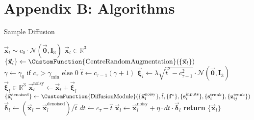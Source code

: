 \section*{Appendix B: Algorithms}
\begin{suppalgorithm}
     \caption{Sample Diffusion}
     {\small
     \begin{algorithmic}[1]
         \State $\vec{\mathbf{x}}_l \sim c_0 \cdot \mathcal{N}(\vec{\mathbf{0}}, \mathbf{I}_3)$ \hfill $\vec{\mathbf{x}}_l \in \mathbb{R}^3$
             \State $\{\vec{\mathbf{x}}_l\} \gets \CustomFunction{\text{CentreRandomAugmentation}}(\{\vec{\mathbf{x}}_l\})$
             \State $\gamma \gets \gamma_0 \text{ if } c_\tau > \gamma_{\min} \text{ else } 0$
             \State $\hat{t} \gets c_{\tau-1}(\gamma + 1)$
             \State $\vec{\boldsymbol{\xi}}_l \gets \lambda \sqrt{\hat{t}^2 - c_{\tau-1}^2} \cdot \mathcal{N}(\vec{\mathbf{0}}, \mathbf{I}_3)$ \hfill $\vec{\boldsymbol{\xi}}_l \in \mathbb{R}^3$
             \State $\vec{\mathbf{x}}_l^{\text{noisy}} \gets \vec{\mathbf{x}}_l + \vec{\boldsymbol{\xi}}_l$
             \State $\{\vec{\mathbf{x}}_l^{\text{denoised}}\} \gets \CustomFunction{\text{DiffusionModule}}(\{\vec{\mathbf{x}}_l^{\text{noisy}}\}, \hat{t}, \{\mathbf{f}^*\}, \{\mathbf{s}_i^{\text{inputs}}\}, \{\mathbf{s}_i^{\text{trunk}}\}, \{\mathbf{z}_{ij}^{\text{trunk}}\})$
             \State $\vec{\boldsymbol{\delta}}_l \gets (\vec{\mathbf{x}}_l - \vec{\mathbf{x}}_l^{\text{denoised}})/\hat{t}$
             \State $dt \gets c_\tau - \hat{t}$
             \State $\vec{\mathbf{x}}_l \gets \vec{\mathbf{x}}_l^{\text{noisy}} + \eta \cdot dt \cdot \vec{\boldsymbol{\delta}}_l$
         \EndFor
         \State \textbf{return} $\{\vec{\mathbf{x}}_l\}$
         \end{algorithmic}
     }
\end{suppalgorithm}

